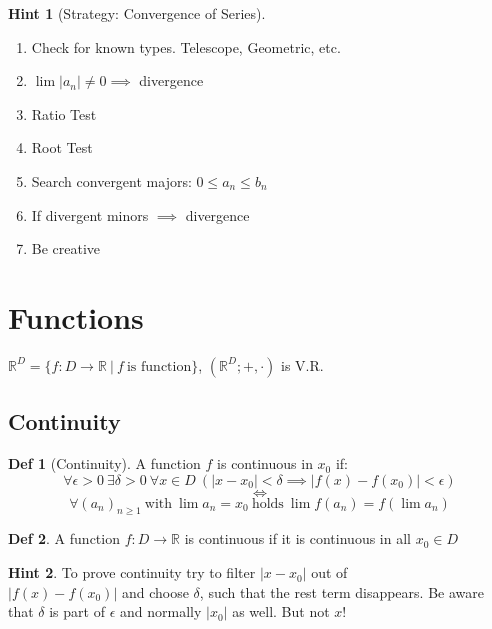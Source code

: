 \documentclass[a4paper, 10pt]{article}
\theoremstyle{definition}
\newtheorem*{definition}{Def}
\newtheorem*{note_wrapper}{Hint}
\theoremstyle{ex}
\theoremstyle{named}
\newenvironment{note}%
    {\begin{mdframed}[style=trick]\begin{note_wrapper}}%
    {\end{note_wrapper}\end{mdframed}}
\newcommand{\R}{\mathbb{R}}
\begin{document}
\begin{note}[Strategy: Convergence of Series]
    $\,$
    \begin{enumerate}
        \item Check for known types. Telescope, Geometric, etc.
        \item $\lim |a_n| \neq 0 \implies$ divergence
        \item Ratio Test
        \item Root Test
        \item Search convergent majors: $0 \leq a_n \leq b_n$
        \item If divergent minors $\implies$ divergence
        \item Be creative
    \end{enumerate}
\end{note}

\section{Functions}
$\R^D = \{f: D \to \R \ | \ f \ \text{is function} \}$, $(\R^D; +, \cdot)$ is V.R.
\subsection{Continuity}
\begin{definition}[Continuity]
    A function $f$ is continuous in $x_0$ if:
    $$\forall \epsilon > 0 \ \exists \delta > 0 \ \forall x \in D \ (|x - x_0| < \delta \implies |f(x) - f(x_0)| < \epsilon)$$
    $$\iff$$
    $$\forall (a_n)_{n \geq 1} \ \text{with} \ \lim a_n = x_0 \ \text{holds} \ \lim f(a_n) = f(\lim a_n)$$
\end{definition}

\begin{definition}
    A function $f: D \to \R$ is continuous if it is continuous in all $x_0 \in D$
\end{definition}

\begin{note}
    To prove continuity try to filter $|x - x_0|$ out of \\
    $|f(x) - f(x_0)|$ and choose $\delta$, such that the rest term disappears. Be aware that $\delta$ is part of $\epsilon$ and normally $|x_0|$ as well. But not $x$!
\end{note}
\end{document}
